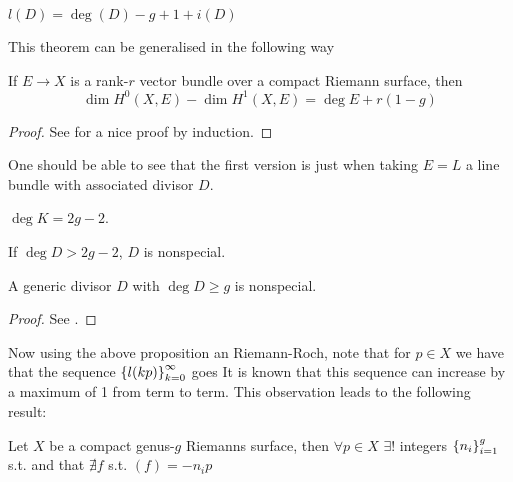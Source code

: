 \documentclass{article}
\begin{document}
\begin{theorem} \label{Thm: Riemann-Roch}
	$l(D) = \deg(D) -g+1 + i(D)$
\end{theorem}
This theorem can be generalised in the following way
\begin{theorem}
	If $E\to X$ is a rank-$r$ vector bundle over a compact Riemann surface, then 
	\[
	\dim H^0(X,E) - \dim H^1(X,E) = \deg E + r(1-g)
	\]
\end{theorem}
\begin{proof}
See \cite{Hitchin2013} for a nice proof by induction. 
\end{proof}
\begin{remark}
One should be able to see that the first version is just when taking $E=L$ a line bundle with associated divisor $D$. 
\end{remark}
\begin{corollary}
	$\deg K = 2g-2$. 
\end{corollary} 

\begin{corollary}
	If $\deg D > 2g-2$, $D$ is nonspecial. 
\end{corollary}

\begin{prop}
	A generic divisor $D$ with $\deg D \geq g$ is nonspecial. 
\end{prop}
\begin{proof}
	See \cite{Dubrovin2009}.
\end{proof}

Now using the above proposition an  Riemann-Roch, note that for $p \in X$ we have that the sequence $\left\{ l(kp) \right\}_{k=0}^\infty$ goes 
It is known that this sequence can increase by a maximum of 1 from term to term. This observation leads to the following result:
\begin{theorem}
	Let $X$ be a compact genus-$g$ Riemanns surface, then $\forall p \in X$ $\exists!$ integers $\left\{ n_i \right\}_{i=1}^g$ s.t. 
	and that $\nexists f$ s.t. $(f)=-n_ip$
\end{theorem}
\end{document}
